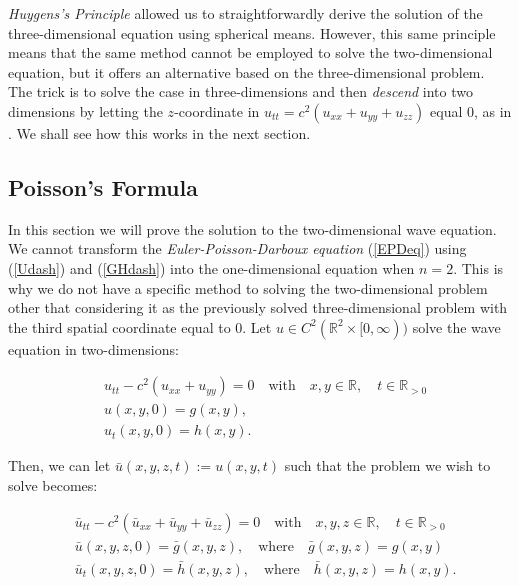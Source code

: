 \documentclass[a4paper, 12pt]{article}
\numberwithin{equation}{section}
\begin{document}
\emph{Huygens's Principle} allowed us to straightforwardly derive the solution of the three-dimensional equation using spherical means. However, this same principle
means that the same method cannot be employed to solve the two-dimensional equation, but it offers an alternative based on the three-dimensional problem. The trick is
to solve the case in three-dimensions and then \emph{descend} into two dimensions by letting the $z$-coordinate in $u_{tt}=c^2(u_{xx}+u_{yy}+u_{zz})$ equal $0$, as in \cite{Ev}. We shall see how this works in the 
next section. 

\subsection{Poisson's Formula}

In this section we will prove the solution to the two-dimensional wave equation. We cannot transform the \emph{Euler-Poisson-Darboux equation} (\ref{EPDeq}) using (\ref{Udash}) and (\ref{GHdash}) 
into the one-dimensional equation when $n=2$. This is why we do not have a specific method to solving the two-dimensional problem other that considering it as the previously solved three-dimensional problem
with the third spatial coordinate equal to $0$. Let $u \in C^2(\mathbb{R}^2 \times [0, \infty))$ solve the wave equation in two-dimensions:

\begin{equation} \label{2d}
    \begin{aligned}
        &u_{tt}-c^2(u_{xx}+u_{yy})=0 \quad \textrm{with} \quad x,y \in \mathbb{R}, \quad t\in \mathbb{R}_{>0}\\
        &u(x, y, 0)=g(x,y),\\
        &u_t(x,y,0)=h(x,y).
    \end{aligned}
\end{equation}

Then, we can let $\bar{u}(x, y, z, t):=u(x, y, t)$ such that the problem we wish to solve becomes:

\begin{equation} \label{2das3d}
    \begin{aligned}
        &\bar{u}_{tt}-c^2(\bar{u}_{xx}+\bar{u}_{yy}+\bar{u}_{zz})=0 \quad \textrm{with} \quad x,y,z \in \mathbb{R}, \quad t\in \mathbb{R}_{>0}\\
        &\bar{u}(x, y, z, 0)=\bar{g}(x,y,z), \quad \textrm{where} \quad \bar{g}(x,y,z)=g(x,y)\\
        &\bar{u}_t(x,y,z,0)=\bar{h}(x,y,z), \quad \textrm{where} \quad \bar{h}(x,y,z)=h(x,y).
    \end{aligned}
\end{equation}
\end{document}
